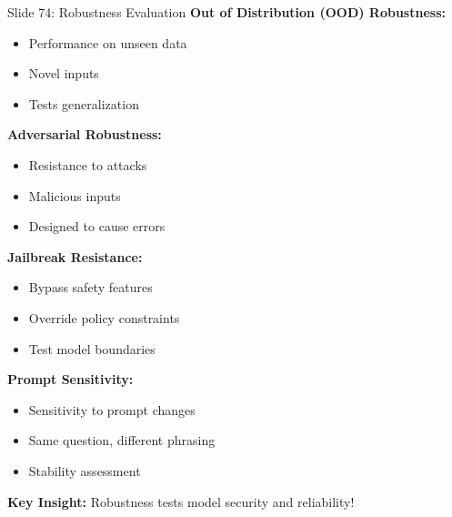 \documentclass[8pt]{beamer}
\begin{document}
	\begin{frame}{Slide 74: Robustness Evaluation}
		\fontsize{6.5}{7.5}\selectfont
		\textbf{Out of Distribution (OOD) Robustness:}
		\begin{itemize}
			\item Performance on unseen data
			\item Novel inputs
			\item Tests generalization
		\end{itemize}
		
		\vspace{0.1cm}
		\textbf{Adversarial Robustness:}
		\begin{itemize}
			\item Resistance to attacks
			\item Malicious inputs
			\item Designed to cause errors
		\end{itemize}
		
		\vspace{0.1cm}
		\textbf{Jailbreak Resistance:}
		\begin{itemize}
			\item Bypass safety features
			\item Override policy constraints
			\item Test model boundaries
		\end{itemize}
		
		\vspace{0.1cm}
		\textbf{Prompt Sensitivity:}
		\begin{itemize}
			\item Sensitivity to prompt changes
			\item Same question, different phrasing
			\item Stability assessment
		\end{itemize}
		
		\textcolor{myblue}{\textbf{Key Insight:}} Robustness tests model security and reliability!
	\end{frame}
	
\end{document}
